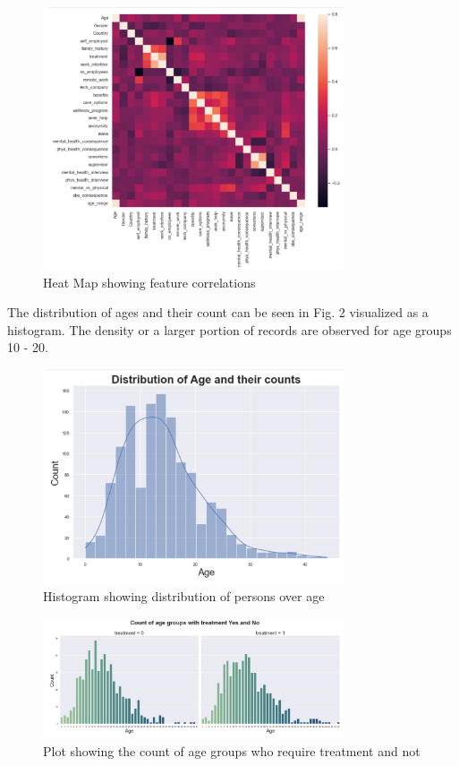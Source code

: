 \documentclass[10pt,journal,compsoc]{IEEEtran}
\begin{document}
\begin{figure}[h]
\centering
\includegraphics[width=3.5in]{heatmap.png}
\caption{Heat Map showing feature correlations}
\end{figure}

\quad The distribution of ages and their count can be seen in Fig. 2 visualized as a histogram. The density or a larger portion of records are observed for age groups 10 - 20.

\begin{figure}[!]
\centering
\includegraphics[width=3.5in]{1.png}
\caption{Histogram showing distribution of persons over age}
\end{figure}


\begin{figure}[h]
\centering
\includegraphics[width=3.5in]{2.png}
\caption{Plot showing the count of age groups who require treatment and not}
\end{figure}
\end{document}
